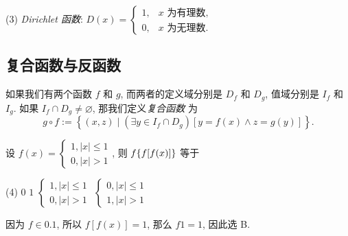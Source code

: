 (3) \textit{Dirichlet 函数}: $ D(x)=\begin{cases}
        1, & x \text { 为有理数, } \\ 0, & x \text { 为无理数. }
    \end{cases}$

\subsection{复合函数与反函数}

\begin{definition}[复合函数]
    如果我们有两个函数 $ f $ 和 $ g $, 而两者的定义域分别是 $ D_{f} $ 和 $ D_{g} $,
    值域分别是 $ I_{f} $ 和 $ I_{g} $. 如果 $ I_{f} \cap D_{g} \neq \varnothing $,
    那我们定义\textit{复合函数} 为 $$ g \circ f:=\left\{(x, z) \mid\left(\exists y \in I_{f} \cap D_{g}\right)[y=f(x) \wedge z=g(y)]\right\} .$$
\end{definition}

\begin{example}[2001 数二]
    设 $f(x)=\begin{cases}
            1,|x|\leqslant 1 \\0,|x|>1
        \end{cases}$, 则 $f\qty{f[f(x)]}$ 等于
    \begin{tasks}(4)
        \task $0$
        \task $1$
        \task $\begin{cases}
                1,|x|\leqslant 1 \\0,|x|>1
            \end{cases}$
        \task $\begin{cases}
                0,|x|\leqslant 1 \\1,|x|>1
            \end{cases}$
    \end{tasks}
\end{example}
\begin{solution}
    因为 $f\in\qty{0,1}$, 所以 $f[f(x)]=1$, 那么 $f\qty{1}=1$, 因此选 B.
\end{solution}

